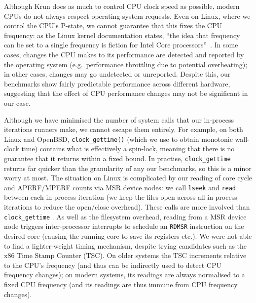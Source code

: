 \documentclass[preprint,numbers,10pt]{sigplanconf}
\newcommand{\krun}{Krun\xspace}
\begin{document}
 Although \krun does as much to control CPU clock speed as possible, modern CPUs
do not always respect operating system requests. Even on Linux, where we control
the CPU's P-state, we cannot guarantee that this fixes the CPU frequency: as
the Linux kernel documentation states, ``the idea that frequency can be set to a single
frequency is fiction for Intel Core processors''~\cite{pstate}. In
some cases, changes the CPU makes to its performance are detected and reported
by the operating system (e.g.~performance throttling due to potential
overheating); in other cases, changes may go undetected or unreported.
Despite this, our benchmarks show fairly predictable performance across
different hardware, suggesting that the effect of CPU performance changes may
not be significant in our case.

Although we have minimised the number of system calls that our in-process
iterations runners make, we cannot escape them entirely. For example,
on both Linux and OpenBSD, \texttt{clock\_gettime()} (which we use to obtain
monotonic wall-clock time) contains what is effectively a spin-lock,
meaning that there is no guarantee that it returns within a fixed bound.
In practise, \texttt{clock\_gettime} returns far quicker than the granularity
of any our benchmarks, so this is a minor worry at most. \label{aperf/mperf error} The situation
on Linux is complicated by our reading of core cycle and APERF/MPERF
counts via MSR device nodes: we call \texttt{lseek} and \texttt{read}
between each in-process iteration (we keep the files open across all
in-process iterations to reduce the open/close overhead).
These calls are more involved than \texttt{clock\_gettime} . As well as the filesystem overhead, reading from a MSR device
node triggers inter-processor interrupts to schedule an \texttt{RDMSR}
instruction on the desired core (causing the running core to save its registers etc.). We
were not able to find a lighter-weight timing mechanism, despite trying
candidates such as the x86 Time Stamp Counter (TSC). On older systems the TSC
increments relative to the CPU's frequency (and thus can be indirectly used to
detect CPU frequency changes); on modern systems, its readings are always
normalised to a fixed CPU frequency (and its readings are thus immune from CPU
frequency changes).
\end{document}
